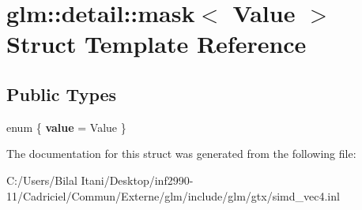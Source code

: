\hypertarget{structglm_1_1detail_1_1mask}{}\section{glm\+:\+:detail\+:\+:mask$<$ Value $>$ Struct Template Reference}
\label{structglm_1_1detail_1_1mask}
\subsection*{Public Types}
\begin{DoxyCompactItemize}
\item 
enum \{ {\bfseries value} = Value
 \}\hypertarget{structglm_1_1detail_1_1mask_a5e277eeead970529af6af3afaa8dcac0}{}\label{structglm_1_1detail_1_1mask_a5e277eeead970529af6af3afaa8dcac0}

\end{DoxyCompactItemize}


The documentation for this struct was generated from the following file\+:\begin{DoxyCompactItemize}
\item 
C\+:/\+Users/\+Bilal Itani/\+Desktop/inf2990-\/11/\+Cadriciel/\+Commun/\+Externe/glm/include/glm/gtx/simd\+\_\+vec4.\+inl\end{DoxyCompactItemize}
